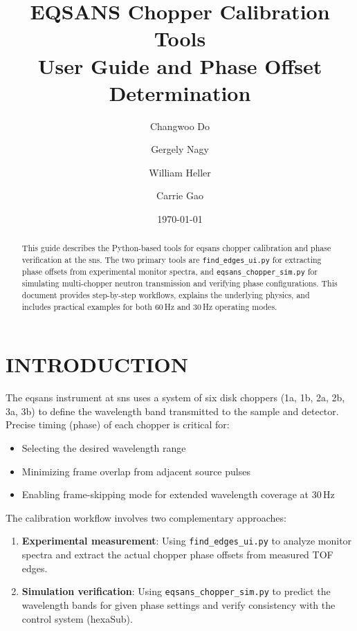 \documentclass[tm]{ornltm}
\author{Changwoo Do \and Gergely Nagy \and William Heller \and Carrie Gao}
\title{EQSANS Chopper Calibration Tools\\[0.5em]
User Guide and Phase Offset Determination}
\date{\today}
\begin{document}
\frontmatter

\tableofcontents
\listoffigures
\listoftables
\printacronyms

\mainmatter
\begin{abstract}
This guide describes the Python-based tools for \ac{eqsans} chopper calibration and phase verification at the \ac{sns}. The two primary tools are \texttt{find\_edges\_ui.py} for extracting phase offsets from experimental monitor spectra, and \texttt{eqsans\_chopper\_sim.py} for simulating multi-chopper neutron transmission and verifying phase configurations. This document provides step-by-step workflows, explains the underlying physics, and includes practical examples for both 60\,Hz and 30\,Hz operating modes.
\end{abstract}

\acresetall

\section{INTRODUCTION}

The \ac{eqsans} instrument at \ac{sns} uses a system of six disk choppers (1a, 1b, 2a, 2b, 3a, 3b) to define the wavelength band transmitted to the sample and detector. Precise timing (phase) of each chopper is critical for:
\begin{itemize}
    \item Selecting the desired wavelength range
    \item Minimizing frame overlap from adjacent source pulses
    \item Enabling frame-skipping mode for extended wavelength coverage at 30\,Hz
\end{itemize}

The calibration workflow involves two complementary approaches:
\begin{enumerate}
    \item \textbf{Experimental measurement}: Using \texttt{find\_edges\_ui.py} to analyze monitor spectra and extract the actual chopper phase offsets from measured TOF edges.
    \item \textbf{Simulation verification}: Using \texttt{eqsans\_chopper\_sim.py} to predict the wavelength bands for given phase settings and verify consistency with the control system (hexaSub).
\end{enumerate}
\end{document}
